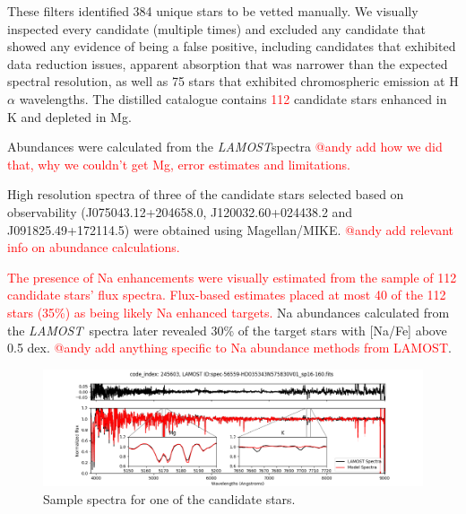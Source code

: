\documentclass[a4paper,fleqn,usenatbib]{mnras}
\newcommand{\todo}[1]{\textcolor{red}{#1}}
\newcommand{\project}[1]{\emph{#1}}
\newcommand{\lamost}{\project{LAMOST}}
\begin{document}
These filters identified 384 unique stars to be vetted manually. We visually inspected every candidate (multiple times) and excluded any candidate that showed any evidence of being a false positive, including candidates that exhibited data reduction issues, apparent absorption that was narrower than the expected spectral resolution, as well as 75 stars that exhibited chromospheric emission at H$\alpha$ wavelengths. The distilled catalogue contains \todo{112} candidate stars enhanced in K and depleted in Mg.

Abundances were calculated from the \lamost spectra \todo{@andy add how we did that, why we couldn't get Mg, error estimates and limitations.}

High resolution spectra of three of the candidate stars selected based on observability (J075043.12+204658.0, J120032.60+024438.2 and J091825.49+172114.5) were obtained using Magellan/MIKE. \todo{@andy add relevant info on abundance calculations.}

\todo{The presence of Na enhancements were visually estimated from the sample of 112 candidate stars' flux spectra. Flux-based estimates placed at most 40 of the 112 stars (35\%) as being likely Na enhanced targets.} Na abundances calculated from the \lamost\ spectra later revealed 30\% of the target stars with [Na/Fe] above 0.5 dex. \todo{@andy add anything specific to Na abundance methods from LAMOST}.


\begin{figure}
	\includegraphics[width=\columnwidth]{posterchildof13.png}
    \caption{Sample spectra for one of the candidate stars.}
    \label{posterchild}
\end{figure}
\end{document}
